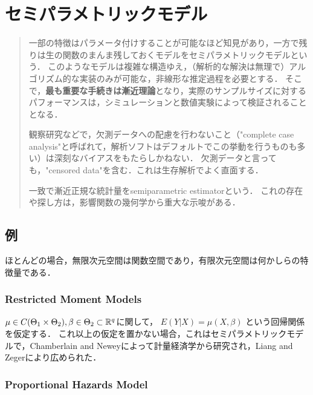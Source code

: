 \documentclass[uplatex,dvipdfmx]{jsreport}
\begin{document}
\chapter{セミパラメトリックモデル}

\begin{quotation}
    一部の特徴はパラメータ付けすることが可能なほど知見があり，一方で残りは生の関数のまんま残しておくモデルをセミパラメトリックモデルという．
    このようなモデルは複雑な構造ゆえ，（解析的な解決は無理で）アルゴリズム的な実装のみが可能な，非線形な推定過程を必要とする．
    そこで，\textbf{最も重要な手続きは漸近理論}となり，実際のサンプルサイズに対するパフォーマンスは，シミュレーションと数値実験によって検証されることとなる．

    観察研究などで，欠測データへの配慮を行わないこと（"complete case analysis"と呼ばれて，解析ソフトはデフォルトでこの挙動を行うものも多い）は深刻なバイアスをもたらしかねない．
    欠測データと言っても，"censored data"を含む．これは生存解析でよく直面する．\cite{Tsiatis}

    一致で漸近正規な統計量をsemiparametric estimatorという．
    これの存在や探し方は，影響関数の幾何学から重大な示唆がある．
\end{quotation}

\section{例}

\begin{tcolorbox}[colframe=ForestGreen, colback=ForestGreen!10!white,breakable,colbacktitle=ForestGreen!40!white,coltitle=black,fonttitle=\bfseries\sffamily,
title=]
    ほとんどの場合，無限次元空間は関数空間であり，有限次元空間は何かしらの特徴量である．
\end{tcolorbox}

\subsection{Restricted Moment Models}

$\mu\in C(\Theta_1\times\Theta_2),\beta\in\Theta_2\subset\mathbb{R}^q$に関して，
$E(Y|X)=\mu(X,\beta)$
という回帰関係を仮定する．
これ以上の仮定を置かない場合，これはセミパラメトリックモデルで，Chamberlain and Neweyによって計量経済学から研究され，Liang and Zegerにより広められた．

\subsection{Proportional Hazards Model}
\end{document}
